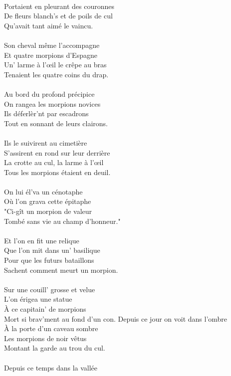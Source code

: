 \\Portaient en pleurant des couronnes
\\De fleurs blanch's et de poils de cul
\\Qu'avait tant aimé le vaincu.
\\\\Son cheval même l'accompagne
\\Et quatre morpions d'Espagne
\\Un' larme à l'œil le crêpe au bras
\\Tenaient les quatre coins du drap.
\\\\Au bord du profond précipice
\\On rangea les morpions novices
\\Ils déferlèr'nt par escadrons
\\Tout en sonnant de leurs clairons.
\\\\Ils le suivirent au cimetière
\\S'assirent en rond sur leur derrière
\\La crotte au cul, la larme à l'œil
\\Tous les morpions étaient en deuil.
\\\\On lui él'va un cénotaphe
\\Où l'on grava cette épitaphe
\\"Ci-gît un morpion de valeur
\\Tombé sans vie au champ d'honneur."
\\\\Et l'on en fit une relique
\\Que l'on mit dans un' basilique
\\Pour que les futurs bataillons
\\Sachent comment meurt un morpion.
\\\\Sur une couill' grosse et velue
\\L'on érigea une statue
\\À ce capitain' de morpions
\\Mort si brav'ment au fond d'un con.
\breakpage
Depuis ce jour on voit dans l'ombre
\\À la porte d'un caveau sombre
\\Les morpions de noir vêtus
\\Montant la garde au trou du cul.
\\\\Depuis ce temps dans la vallée

